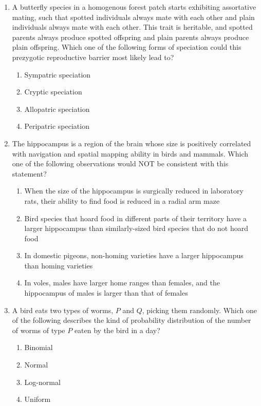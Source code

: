 \documentclass[journal]{IEEEtran}
\begin{document}
\begin{enumerate}
    \item A butterfly species in a homogenous forest patch starts exhibiting assortative mating, such that spotted individuals always mate with each other and plain individuals always mate with each other.
This trait is heritable, and spotted parents always produce spotted offspring and plain parents always produce plain offspring.
Which one of the following forms of speciation could this prezygotic reproductive barrier most likely lead to?
\begin{multicols}{2}
    \begin{enumerate}
        \item Sympatric speciation
        \item Cryptic speciation
        \item Allopatric speciation
        \item Peripatric speciation
    \end{enumerate}
    \end{multicols}

    \item The hippocampus is a region of the brain whose size is positively correlated with navigation and spatial mapping ability in birds and mammals.
Which one of the following observations would NOT be consistent with this statement?
\begin{enumerate}
        \item When the size of the hippocampus is surgically reduced in laboratory rats, their ability to find food is reduced in a radial arm maze
        \item Bird species that hoard food in different parts of their territory have a larger hippocampus than similarly-sized bird species that do not hoard food
        \item In domestic pigeons, non-homing varieties have a larger hippocampus than homing varieties
        \item In voles, males have larger home ranges 
than females, and the hippocampus of males is larger than that of females
    \end{enumerate}

    \item A bird eats two types of worms, $P$ and $Q$, picking them randomly.
Which one of the following describes the kind of probability distribution of the number of worms of type $P$ eaten by the bird in a day?
\begin{multicols}{2}
    \begin{enumerate}
        \item Binomial
        \item Normal
        \item Log-normal
        \item Uniform
    \end{enumerate}
    \end{multicols}


\end{enumerate}
\end{document}

